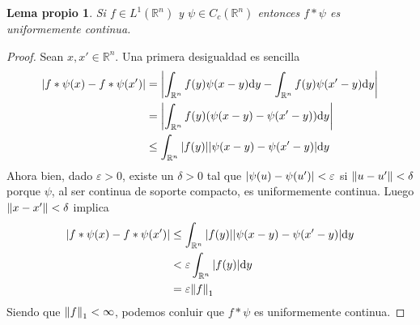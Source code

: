 \documentclass{article}
\newcommand{\realNumbers}{\mathbb{R}}
\newtheorem{myLemma}{Lema propio}
\theoremstyle{remark}
\begin{document}
  \begin{myLemma}
    \label{myLemma:convolutionWithCompactlySupportedFunction}
    Si \(f \in L^1(\realNumbers^n)\) y \(\psi \in C_c(\realNumbers^n)\) entonces \(f * \psi\) es uniformemente continua.
  \end{myLemma}
  \begin{proof}
    Sean \(x, x' \in \realNumbers^n\).
    Una primera desigualdad es sencilla
    \begin{align}
      \abs{f * \psi (x) - f * \psi (x')}
      &=
      \abs{
        \int_{\realNumbers^n} f(y) \psi(x - y) \dd y
        -
        \int_{\realNumbers^n} f(y) \psi(x' - y) \dd y
      }
      \\
      &=
      \abs{
        \int_{\realNumbers^n} f(y) (\psi(x - y) - \psi(x' - y)) \dd y
      }
      \\
      &\leq
      \int_{\realNumbers^n} \abs{f(y)} \abs{\psi(x - y) - \psi(x' - y)} \dd y
    \end{align}
    Ahora bien, dado \(\varepsilon > 0\), existe un \(\delta > 0\) tal que \(\abs{\psi(u) - \psi(u')} < \varepsilon\) si \(\norm{u - u'} < \delta\) porque \(\psi\), al ser continua de soporte compacto, es uniformemente continua.
    Luego \(\norm{x - x'} < \delta\) implica
    \begin{align}
      \abs{f * \psi (x) - f * \psi (x')}
      &\leq
      \int_{\realNumbers^n} \abs{f(y)} \abs{\psi(x - y) - \psi(x' - y)} \dd y
      \\
      &<
      \varepsilon \int_{\realNumbers^n} \abs{f(y)} \dd y
      \\
      &=
      \varepsilon \norm{f}_1
    \end{align}
    Siendo que \(\norm{f}_1 < \infty\), podemos conluir que \(f * \psi\) es uniformemente continua.
  \end{proof}
\end{document}
